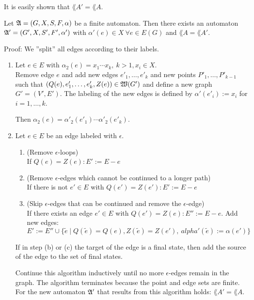It is easily shown that $\lang{A'} = \lang{A}$.

\begin{lemma}
Let $\mbox{$\mathfrak{A}$} = (G, X, S, F, \alpha)$ be a finite automaton. Then there
exists an automaton $\mbox{$\mathfrak{A'}$} = (G', X, S', F', \alpha')$ with $\alpha'(e)
\in X\ \forall e \in E(G)$ and $\lang{A} = \lang{A'}$.
\end{lemma}

Proof: We ''split'' all edges according to their labels.

\begin{enumerate}
  \item Let $e \in E$ with $\alpha_2(e) = x_1 \cdots x_k,\ k > 1, x_i \in X$.\\
  Remove edge $e$ and add new edges $e'_1,
  \ldots, e'_k$ and new points $P'_1, \ldots, P'_{k-1}$ such that $(Q(e),
  e'_1, \ldots, e'_k, Z(e)) \in \mbox{$\mathfrak{W}(G')$}$ and define a new graph $G' =
  (V', E')$. The labeling of the new edges is defined by $\alpha'(e'_i) := x_i$
  for $i = 1, \ldots, k$.
  
  Then $\alpha_2(e) = \alpha'_2(e'_1) \cdots \alpha'_2(e'_k)$.
  
  \item Let $e \in E$ be an edge labeled with $\epsilon$.
  \begin{enumerate}
    \item  (Remove $\epsilon$-loops) \\
    If $Q(e) = Z(e) : E' := E - e$
    \item (Remove
    $\epsilon$-edges which cannot be continued to a longer path)\\
    If there is
    not $e' \in E$ with $Q(e') = Z(e') : E' := E - e$
    \item  (Skip $\epsilon$-edges that can be continued and remove the
    $\epsilon$-edge)\\
    If there exists an edge $e' \in E$ with $Q(e') = Z(e) : E'' := E - e$.
    Add new edges: $E' := E'' \cup \{
    \tilde{e} \mid Q(\tilde{e}) = Q(e), Z(\tilde{e}) = Z(e'),\
    alpha'(\tilde{e}) := \alpha(e') \}$
  \end{enumerate}
  If in step (b) or (c) the target of the edge is a final state, then add the
  source of the edge to the set of final states.
  
  Continue this algorithm inductively until no more $\epsilon$-edges remain in
  the graph. The algorithm terminates because the point and edge sets are
  finite. For the new automaton $\mbox{$\mathfrak{A'}$}$ that results from this algorithm
  holds: $\lang{A'} = \lang{A}$.
\end{enumerate}

